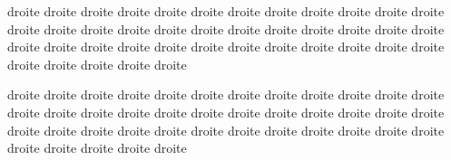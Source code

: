 \documentclass[12pt]{book}
\begin{document}
\begin{pages}
\begin{Rightside}
\pstart
\begin{ledgroup}
droite droite droite droite droite droite droite droite droite droite droite droite droite droite droite droite droite droite droite droite droite droite droite droite droite droite droite droite droite droite droite droite droite droite droite droite droite droite droite droite droite

droite droite droite droite droite droite droite droite droite droite droite droite droite droite droite droite droite droite droite droite droite droite droite droite droite droite droite droite droite droite droite droite droite droite droite droite droite droite droite droite droite
\end{ledgroup}
\pend
\endnumbering
\end{Rightside}

\end{pages}
\Pages
\end{document}
